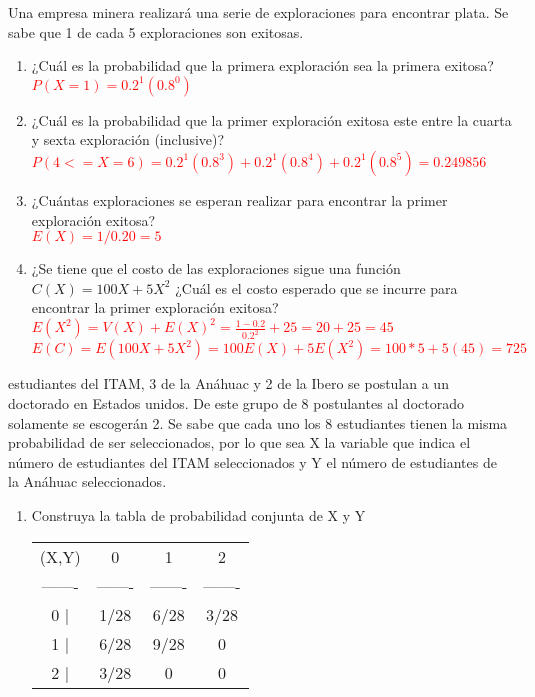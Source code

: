 \documentclass[addpoints]{exam}
\theoremstyle{mytheor}
\begin{document}
\begin{questions}
\question Una empresa minera realizará una serie de exploraciones para encontrar plata. Se sabe que 1 de cada 5 exploraciones son exitosas. 
   \begin{enumerate}
   \item ¿Cuál es la probabilidad que la primera exploración sea la primera exitosa? \\
   \textcolor{red}{$P(X = 1) = 0.2^1 (0.8^0)$}
   \item ¿Cuál es la probabilidad que la primer exploración exitosa este entre la cuarta y sexta exploración (inclusive)? \\
   \textcolor{red}{$P( 4 <= X = 6) = 0.2^1 (0.8^3)+ 0.2^1 (0.8^4) + 0.2^1 (0.8^5) = 0.249856$}
   \item ¿Cuántas exploraciones se esperan realizar para encontrar la primer exploración exitosa? \\
   \textcolor{red}{$E(X) = 1/0.20 = 5$}
   \item ¿Se tiene que el costo de las exploraciones sigue una función $C(X) = 100X+5X^2$ ¿Cuál es el costo esperado que se incurre para encontrar la primer exploración exitosa?\\
   \textcolor{red}{$E(X^2) = V(X)+E(X)^2 = \frac{1-0.2}{0.2^2} + 25 = 20 + 25 = 45$} \\
   \textcolor{red}{$E(C) = E(100X+5X^2) = 100E(X)+5E(X^2) = 100*5 + 5(45) = 725$}
   
   \end{enumerate}
  
  

   estudiantes del ITAM, 3 de la Anáhuac y 2 de la Ibero se postulan a un doctorado en Estados unidos. De este grupo de 8 postulantes al doctorado solamente se escogerán 2. Se sabe que cada uno los 8 estudiantes tienen la misma probabilidad de ser seleccionados, por lo que sea X la variable que indica el número de estudiantes del ITAM seleccionados y Y el número de estudiantes de la Anáhuac seleccionados. 
  
     \begin{enumerate}
   \item Construya la tabla de probabilidad conjunta de X y Y \\
  
\begin{center}
\begin{tabular}{ c c c c }

 (X,Y) & 0 & 1 & 2\\ 
 ------- & ------- & ------- & -------\\
 0 | & 1/28 & 6/28 & 3/28\\  
 1 | & 6/28 & 9/28 & 0 \\    
 2 | & 3/28 & 0 & 0   
\end{tabular}
\end{center}


\end{enumerate}
\end{questions}
\end{document}
